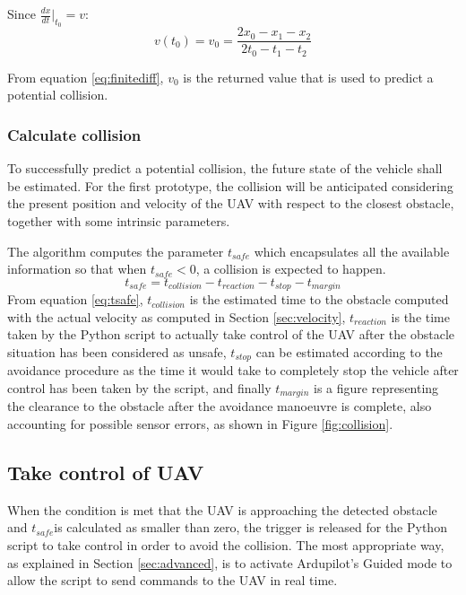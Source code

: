 Since $\frac{dx}{dt}\big\rvert_{t_0}=v$:
\begin{equation}
	v\left(t_0\right)=v_0=\frac{2x_0-x_1-x_2}{2t_0-t_1-t_2}
	\label{eq:finitediff}
\end{equation}

From equation \eqref{eq:finitediff}, $v_0$ is the returned value that is used to predict a potential collision.

\subsubsection{Calculate collision}

To successfully predict a potential collision, the future state of the vehicle shall be estimated.
For the first prototype, the collision will be anticipated considering the present position and velocity of the UAV with respect to the closest obstacle, together with some intrinsic parameters.

The algorithm computes the parameter $t_{safe}$ which encapsulates all the available information so that when $t_{safe}<0$, a collision is expected to happen.
\begin{equation}
	t_{safe}=t_{collision}-t_{reaction}-t_{stop}-t_{margin}
	\label{eq:tsafe}
\end{equation}
From equation \eqref{eq:tsafe}, $t_{collision}$ is the estimated time to the obstacle computed with the actual velocity as computed in Section \ref{sec:velocity}, $t_{reaction}$ is the time taken by the Python script to actually take control of the UAV after the obstacle situation has been considered as unsafe, $t_{stop}$ can be estimated according to the avoidance procedure as the time it would take to completely stop the vehicle after control has been taken by the script, and finally $t_{margin}$ is a figure representing the clearance to the obstacle after the avoidance manoeuvre is complete, also accounting for possible sensor errors, as shown in Figure \ref{fig:collision}.



\subsection{Take control of UAV} \label{sec:takeControl}

When the condition is met that the UAV is approaching the detected obstacle and $t_{safe}$is calculated as smaller than zero, the trigger is released for the Python script to take control in order to avoid the collision.
The most appropriate way, as explained in Section \ref{sec:advanced}, is to activate Ardupilot's Guided mode to allow the script to send commands to the UAV in real time.

